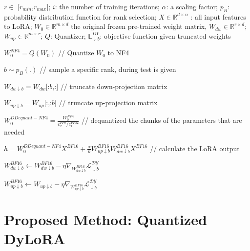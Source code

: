 \documentclass[11pt]{article}
\begin{document}
\begin{algorithm}[tbh]
 \scriptsize
\caption{QDyLoRA - Training and Inference}
\begin{algorithmic}
\REQUIRE $r\in$ [$r_{min}$,$r_{max}$]; $i$: the number of training iterations; $\alpha$: a scaling factor; $p_B$: probability distribution function for rank selection; $X \in \mathbb{R}^{d \times n}$ : all input features to LoRA; $W_0 \in \mathbb{R}^{m \times d}$ the original frozen pre-trained weight matrix, $W_{dw} \in \mathbb{R}^{r \times d}$; $W_{up} \in \mathbb{R}^{m \times r}$; $Q$: Quantizer; $\mathbb{L}_{\downarrow b}^{DY}$: objective function given truncated weights 

\STATE $W_0^{NF4}=Q(W_0)$ {\color{gray} // Quantize $W_0$ to NF4 \color{black}}


    \STATE $b\sim p_B(.)$ {\color{gray} // sample a specific rank, during test is given \color{black}} 
    
    \STATE $W_{dw \downarrow b} = W_{dw}$[:$b$,:] {\color{gray} // truncate down-projection matrix \color{black}} 

    \STATE $W_{up \downarrow b} = W_{up}$[:,:$b$]  {\color{gray} // truncate up-projection matrix \color{black}} 

    \STATE $W_0^{DDequant-NF4}=\frac{W_0^{NF4}}{c_2^{FP8}/c_1^{FP32}}$ {\color{gray} // dequantized the chunks of the parameters that are needed  \color{black}}

    \STATE $h = W_0^{DDequant-NF4}X^{BF16}+ \frac{\alpha}{b} W_{up \downarrow b}^{BF16} W_{dw \downarrow b}^{BF16} X^{BF16}$ {\color{gray} // calculate the LoRA output \color{black}} 
    
    \STATE $W_{dw\downarrow b}^{BF16}  \leftarrow W_{dw\downarrow b}^{BF16} - \eta \nabla_{W_{dw\downarrow b}^{BF16}} \mathcal{L}_{\downarrow b}^{\mathcal{DY}}$
    
    \STATE  $W_{up\downarrow b}^{BF16}  \leftarrow W_{up\downarrow b} - \eta \nabla_{W_{up\downarrow b}^{BF16}} \mathcal{L}_{\downarrow b}^{\mathcal{DY}}$
\ENDWHILE
\end{algorithmic}
\label{alg}
\end{algorithm}

\section{Proposed Method: Quantized DyLoRA}
\end{document}
